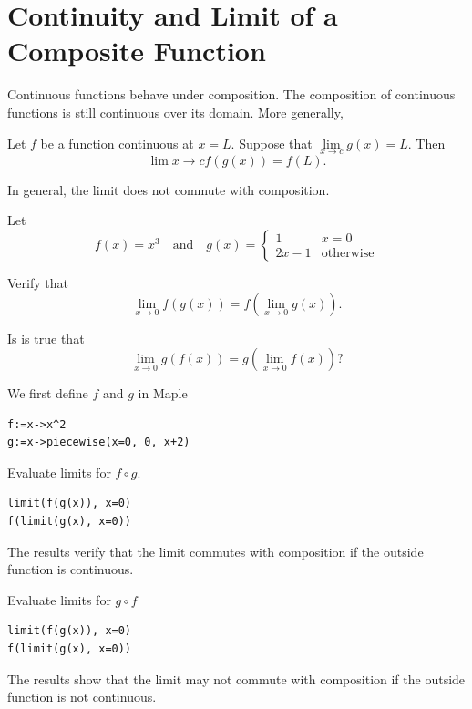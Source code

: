 \documentclass[]{book}
\theoremstyle{definition}
\theoremstyle{definition}
\theoremstyle{definition}
\theoremstyle{remark}
\let\BeginKnitrBlock\begin \let\EndKnitrBlock\end
\begin{document}
\hypertarget{continuity-and-limit-of-a-composite-function}{%
\section{Continuity and Limit of a Composite Function}\label{continuity-and-limit-of-a-composite-function}}

Continuous functions behave under composition. The composition of continuous functions is still continuous over its domain. More generally,

\BeginKnitrBlock{theorem}
\protect\hypertarget{thm:unnamed-chunk-26}{}{\label{thm:unnamed-chunk-26} }Let \(f\) be a function continuous at \(x=L\). Suppose that \(\lim\limits_{x\to c}g(x)=L\). Then
\[
\lim{x\to c}f(g(x))=f(L).
\]
\EndKnitrBlock{theorem}

In general, the limit does not commute with composition.

\BeginKnitrBlock{example}
\protect\hypertarget{exm:unnamed-chunk-27}{}{\label{exm:unnamed-chunk-27} }
Let
\[
f(x)=x^3\quad \text{and}\quad
g(x)=
\begin{cases}
1 & x=0\\
2x-1 & \text{otherwise}
\end{cases}
\]

Verify that
\[
\lim_{x\to 0}f(g(x))=f(\lim_{x\to 0}g(x)).
\]

Is is true that
\[
\lim_{x\to 0}g(f(x))=g(\lim_{x\to 0}f(x))?
\]
\EndKnitrBlock{example}

\BeginKnitrBlock{solution}
{}We first define \(f\) and \(g\) in Maple

\begin{verbatim}
f:=x->x^2
g:=x->piecewise(x=0, 0, x+2)
\end{verbatim}

Evaluate limits for \(f\circ g\).

\begin{verbatim}
limit(f(g(x)), x=0)
f(limit(g(x), x=0))
\end{verbatim}

The results verify that the limit commutes with composition if the outside function is continuous.

Evaluate limits for \(g\circ f\)

\begin{verbatim}
limit(f(g(x)), x=0)
f(limit(g(x), x=0))
\end{verbatim}

The results show that the limit may not commute with composition if the outside function is not continuous.
\EndKnitrBlock{solution}
\end{document}
